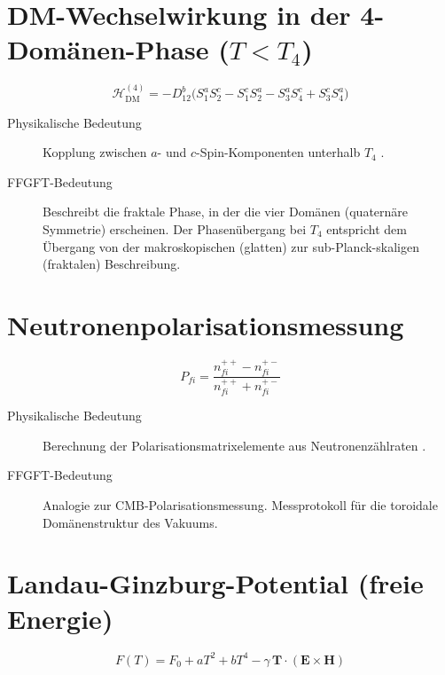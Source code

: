 \section{DM-Wechselwirkung in der 4-Domänen-Phase \texorpdfstring{($T < T_4$)}{}}

\begin{equation}
  \mathcal{H}_{\mathrm{DM}}^{(4)} =
  -D_{12}^b \bigl(S_1^a S_2^c - S_1^c S_2^a - S_3^a S_4^c + S_3^c S_4^a\bigr)
  \label{eq:DM-4domain}
\end{equation}

\begin{description}
  \item[Physikalische Bedeutung] Kopplung zwischen $a$- und $c$-Spin-Komponenten
    unterhalb $T_4$ \cite[Gl.~6]{Qureshi2026}.
  \item[FFGFT-Bedeutung] Beschreibt die fraktale Phase, in der die vier
    Domänen (quaternäre Symmetrie) erscheinen.
    Der Phasenübergang bei $T_4$ entspricht dem Übergang von der makroskopischen
    (glatten) zur sub-Planck-skaligen (fraktalen) Beschreibung.
\end{description}

\section{Neutronenpolarisationsmessung}

\begin{equation}
  P_{fi} = \frac{n_{fi}^{++} - n_{fi}^{+-}}{n_{fi}^{++} + n_{fi}^{+-}}
  \label{eq:neutron-polarisation}
\end{equation}

\begin{description}
  \item[Physikalische Bedeutung] Berechnung der Polarisationsmatrixelemente
    aus Neutronenzählraten \cite[Gl.~7]{Qureshi2026}.
  \item[FFGFT-Bedeutung] Analogie zur CMB-Polarisationsmessung.
    Messprotokoll für die toroidale Domänenstruktur des Vakuums.
\end{description}

\section{Landau-Ginzburg-Potential (freie Energie)}

\begin{equation}
  F(T) = F_0 + a T^2 + b T^4 - \gamma\,\mathbf{T}\cdot(\mathbf{E}\times\mathbf{H})
  \label{eq:LG-potential}
\end{equation}


